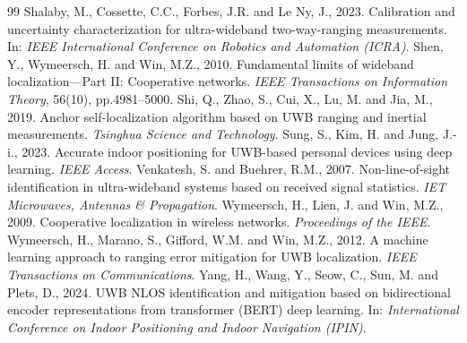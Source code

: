 \documentclass[10pt,a4paper]{article}
\begin{document}
\begin{thebibliography}{99}
 Shalaby, M., Cossette, C.C., Forbes, J.R. and Le Ny, J., 2023. Calibration and uncertainty characterization for ultra-wideband two-way-ranging measurements. In: \emph{IEEE International Conference on Robotics and Automation (ICRA)}.
 Shen, Y., Wymeersch, H. and Win, M.Z., 2010. Fundamental limits of wideband localization---Part II: Cooperative networks. \emph{IEEE Transactions on Information Theory}, 56(10), pp.4981--5000.
 Shi, Q., Zhao, S., Cui, X., Lu, M. and Jia, M., 2019. Anchor self-localization algorithm based on UWB ranging and inertial measurements. \emph{Tsinghua Science and Technology}.
 Sung, S., Kim, H. and Jung, J.-i., 2023. Accurate indoor positioning for UWB-based personal devices using deep learning. \emph{IEEE Access}.
 Venkatesh, S. and Buehrer, R.M., 2007. Non-line-of-sight identification in ultra-wideband systems based on received signal statistics. \emph{IET Microwaves, Antennas \& Propagation}.
 Wymeersch, H., Lien, J. and Win, M.Z., 2009. Cooperative localization in wireless networks. \emph{Proceedings of the IEEE}.
 Wymeersch, H., Marano, S., Gifford, W.M. and Win, M.Z., 2012. A machine learning approach to ranging error mitigation for UWB localization. \emph{IEEE Transactions on Communications}.
 Yang, H., Wang, Y., Seow, C., Sun, M. and Plets, D., 2024. UWB NLOS identification and mitigation based on bidirectional encoder representations from transformer (BERT) deep learning. In: \emph{International Conference on Indoor Positioning and Indoor Navigation (IPIN)}.
\end{thebibliography}
\endgroup
\end{document}
